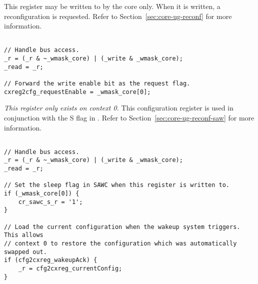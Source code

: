 

This register may be written to by the core only. When it is written, a
reconfiguration is requested. Refer to Section~\ref{sec:core-ug-reconf} for more
information.

\declaration{}
\implementation{}
\begin{lstlisting}

// Handle bus access.
_r = (_r & ~_wmask_core) | (_write & _wmask_core);
_read = _r;

// Forward the write enable bit as the request flag.
cxreg2cfg_requestEnable = _wmask_core[0];

\end{lstlisting}



\emph{This register only exists on context 0.} This configuration register is 
used in conjunction with the S flag in . Refer to
Section~\ref{sec:core-ug-reconf-saw} for more information.

\declaration{}
\implementation{}
\begin{lstlisting}

// Handle bus access.
_r = (_r & ~_wmask_core) | (_write & _wmask_core);
_read = _r;

// Set the sleep flag in SAWC when this register is written to.
if (_wmask_core[0]) {
    cr_sawc_s_r = '1';
}

// Load the current configuration when the wakeup system triggers. This allows
// context 0 to restore the configuration which was automatically swapped out.
if (cfg2cxreg_wakeupAck) {
    _r = cfg2cxreg_currentConfig;
}

\end{lstlisting}

